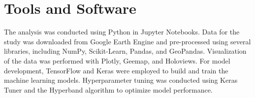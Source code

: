 \section{Tools and Software}

The analysis was conducted using Python in Jupyter Notebooks. Data for the study was downloaded from Google Earth Engine and pre-processed using several libraries, including NumPy, Scikit-Learn, Pandas, and GeoPandas. Visualization of the data was performed with Plotly, Geemap, and Holoviews. For model development, TensorFlow and Keras were employed to build and train the machine learning models. Hyperparameter tuning was conducted using Keras Tuner and the Hyperband algorithm to optimize model performance.

